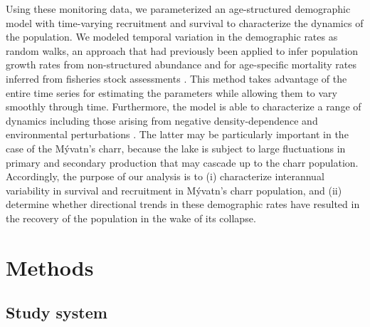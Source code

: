 \documentclass[11pt]{article}
\begin{document}
Using these monitoring data, 
we parameterized an age-structured demographic model with time-varying recruitment 
and survival to characterize the dynamics of the population.
We modeled temporal variation in the demographic rates as random walks, 
an approach that had previously been applied 
to infer population growth rates from non-structured abundance 
\citep{zeng1998, ives2012detecting}
and for age-specific mortality rates inferred from fisheries stock assessments 
\citep{nielsen2014estimation}. 
This method takes advantage of the entire time series for estimating the parameters 
while allowing them to vary smoothly through time. 
Furthermore, the model is able to characterize a range of dynamics including those
arising from negative density-dependence and environmental perturbations
\citep{ives2012detecting}.
The latter may be particularly important in the case of the M\'{y}vatn's charr,
because the lake is subject to large fluctuations 
in primary \citep{phillips2020time, mccormick2021shifts} 
and secondary \citep{einarsson2004clad, gardarsson2004population}
production that may cascade up to the charr population.
Accordingly, the purpose of our analysis is to 
(i) characterize interannual variability in survival and recruitment 
in M\'{y}vatn's charr population, 
and (ii) determine whether directional trends in these demographic rates have
resulted in the recovery of the population in the wake of its collapse. 





\section*{Methods} 

\subsection*{Study system} 
\end{document}
